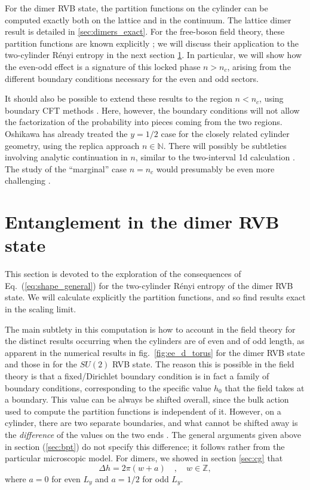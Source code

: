 \documentclass[11pt]{iopart}
\begin{document}
For the dimer RVB state, the partition functions on the cylinder can be computed exactly both on the lattice and in the continuum.  The lattice dimer result is detailed in \ref{sec:dimers_exact}. For the free-boson field theory, these partition functions are known explicitly \cite{BigYellowBook};  we will discuss their application to the two-cylinder R\'enyi entropy in the next section \ref{sec:dimers_entanglement}. In particular, we will show how the even-odd effect is a signature of this locked phase  $n>n_c$, arising from the different boundary conditions necessary for the even and odd sectors.


It should also be possible to extend these results to the region $n<n_c$, using boundary CFT methods \cite{Shannonee,Oshikawa,Zaletel,Stephan2011}. Here, however, the boundary conditions will not allow the factorization of the probability into pieces coming from the two regions. Oshikawa\cite{Oshikawa} has already treated the $y=1/2$ case for the closely related cylinder geometry, using the replica approach $n\in \mathbb{N}$. There will possibly be subtleties involving analytic continuation in $n$, similar to the two-interval 1d calculation \cite{CCT1,CCT2}. The study of the ``marginal'' case $n=n_c$ would presumably be even more challenging \cite{Stephan2010,Stephan2011}.


\section{Entanglement in the dimer RVB state}
\label{sec:dimers_entanglement}

This section is devoted to the exploration of the consequences of Eq.~(\ref{eq:shape_general}) for the two-cylinder R\'enyi entropy of the dimer RVB state. We will calculate explicitly the partition functions, and so find results exact in the scaling limit. 

The main subtlety in this computation is how to account in the field theory for the distinct results occurring when the cylinders are of even and of odd length, as apparent in the numerical results in fig.\ \ref{fig:ee_d_torus} for the dimer RVB state and those in \cite{Ju2012} for the $SU(2)$ RVB state. The reason this is possible in the field theory is that a fixed/Dirichlet boundary condition is in fact a family of boundary conditions, corresponding to the specific value $h_0$ that the field takes at a boundary. This value can be always be shifted overall, since the bulk action used to compute the partition functions is independent of it. However, on a cylinder, there are two separate boundaries, and what cannot be shifted away is the {\em difference} of the values on the two ends \cite{OshikawaAffleck1,OshikawaAffleck2}.    
The general arguments given above in section (\ref{sec:bpt}) do not specify this difference; it follows rather from the particular microscopic model. For dimers, we showed in section \ref{sec:cg} that 
\begin{equation}
 \Delta h =2\pi (w+a)\quad,\quad w \in \mathbb{Z},
\end{equation}
where $a=0$ for even $L_y$ and $a=1/2$ for odd $L_y$. 
\end{document}

